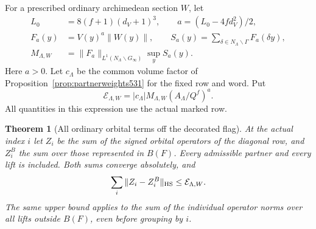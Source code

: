 \documentclass[a4paper,11pt]{article}
\newtheorem{theorem}[proposition]{Theorem}
\theoremstyle{definition}
\theoremstyle{remark}
\numberwithin{equation}{section}
\begin{document}
For a prescribed ordinary archimedean section \(W\), let
\[
 \begin{split}
  L_0&=8(f+1)(d_V+1)^3,\qquad a=(L_0-4fd_V^2)/2,\\
  F_a(y)&=V(y)^a\|W(y)\|,\qquad
  S_a(y)=\sum_{\delta\in N_\Lambda\backslash\Gamma}F_a(\delta y),\\
  M_{\Lambda,W}&=\|F_a\|_{L^1(N_\Lambda\backslash G_\infty)}
                          \sup_y S_a(y).
 \end{split}
\]
Here \(a>0\). Let \(c_\Lambda\) be the common volume factor of
Proposition~\ref{prop:partnerweights531} for the fixed row and
word. Put
\[
         \mathcal E_{\Lambda,W}
          =|c_\Lambda|M_{\Lambda,W}(A_\Lambda/Q^f)^a .
\]
All quantities in this expression use the actual marked row.

\begin{theorem}[All ordinary orbital terms off the decorated flag]
\leavevmode\label{thm:totaldiagonal540}
At the actual index \(i\) let \(Z_i\) be the sum of the signed
orbital operators of the diagonal row, and \(Z_i^B\) the sum
over those represented in \(B(F)\). Every admissible partner
and every lift is included. Both sums converge absolutely, and
\[
             \sum_i\|Z_i-Z_i^B\|_{\rm HS}\le\mathcal E_{\Lambda,W}.
\]
The same upper bound applies to the sum of the individual operator
norms over all lifts outside \(B(F)\), even before grouping by \(i\).
\end{theorem}
\end{document}
